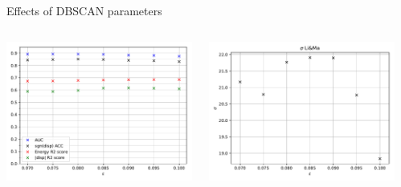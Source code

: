 \begin{frame}{Effects of DBSCAN parameters}
  \begin{columns}[onlytextwidth]
    \begin{column}{0.33\textwidth}
      \centering
      \includegraphics[width=\textwidth]{fig/eps_scores.pdf}
    \end{column}
  \hfill%
    \begin{column}{0.33\textwidth}
        \centering
        \includegraphics[width=\textwidth]{fig/eps_sigma.pdf}
    \end{column}
    \hfill%
      \begin{column}{0.33\textwidth}
          \centering

\end{column}
\end{columns}
\end{frame}
